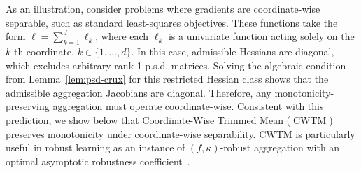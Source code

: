 \documentclass[twoside,11pt]{article}
\begin{document}
As an illustration, consider problems where gradients are coordinate-wise separable, such as standard least-squares objectives. 
These functions take the form $\ell = \sum_{k=1}^d \ell_k$, where each $\ell_k$ is a univariate function acting solely on the $k$-th coordinate, $k\in\{1, \ldots, d\}$.
In this case, admissible Hessians are diagonal, which excludes arbitrary rank-1 p.s.d. matrices. 
Solving the algebraic condition from Lemma~\ref{lem:psd-crux} for this restricted Hessian class shows that the admissible aggregation Jacobians are diagonal. 
Therefore, any monotonicity-preserving aggregation must operate coordinate-wise.
Consistent with this prediction, we show below that Coordinate-Wise Trimmed Mean ($\operatorname{CWTM}$) preserves monotonicity under coordinate-wise separability. 
$\mathrm{CWTM}$ is particularly useful in robust learning as an instance of $(f, \kappa)$-robust aggregation with an optimal asymptotic robustness coefficient~\citep[Definition 2 \& Proposition 2]{pmlr-v206-allouah23a}.
\end{document}
